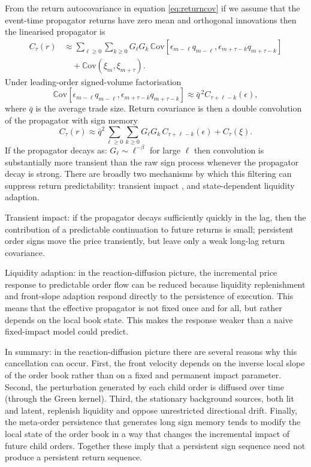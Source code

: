 \documentclass[5p,final]{elsarticle}
\newcommand{\Cov}{\mathbb{C}\mathrm{ov}}
\begin{document}
From the return autocovariance in equation \ref{eq:returncov} if we assume that the event-time propagator returns have zero mean and orthogonal innovations then the linearised propagator is
\begin{align}
C_{\tau}(r)
&\approx
\sum_{\ell\ge0}\sum_{k\ge0}G_\ell G_k\,
\Cov[\epsilon_{m-\ell}q_{m-\ell},\epsilon_{m+\tau-k}q_{m+\tau-k}] \nonumber \\
&\quad +
\Cov(\xi_m,\xi_{m+\tau}).
\end{align}
Under leading-order signed-volume factorisation 
\begin{equation}
\Cov[\epsilon_{m-\ell}q_{m-\ell},\epsilon_{m+\tau-k}q_{m+\tau-k}]
\approx \bar q^{\,2}C_{\tau+\ell-k}(\epsilon),
\end{equation}
where $\bar q$ is the average trade size. Return covariance is then a double convolution of the propagator with sign memory
\begin{equation}
    C_{\tau}(r) \approx \bar q^2 \sum_{\ell\ge0}\sum_{k\ge0}G_\ell G_k\,
C_{\tau+\ell-k}(\epsilon) + C_{\tau} (\xi).
\end{equation}
If the propagator decays as: $G_{\ell} \sim \ell^{-\beta}$ \cite{toth2011anomalous} for large $\ell$ then convolution is substantially more transient than the raw sign process whenever the propagator decay is strong. There are broadly two mechanisms by which this filtering can suppress return predictability: transient impact \cite{donier2015fully}, and state-dependent liquidity adaption. 

Transient impact: if the propagator decays sufficiently quickly in the lag, then the contribution of a predictable continuation to future returns is small; persistent order signs move the price transiently, but leave only a weak long-lag return covariance. 

Liquidity adaption: in the reaction-diffusion picture, the incremental price response to predictable order flow can be reduced because liquidity replenishment and front-slope adaption respond directly to the persistence of execution. This means that the effective propagator is not fixed once and for all, but rather depends on the local book state. This makes the response weaker than a naive fixed-impact model could predict. 

In summary: in the reaction-diffusion picture there are several reasons why this cancellation can occur. First, the front velocity depends on the inverse local slope of the order book rather than on a fixed and permanent impact parameter. Second, the perturbation generated by each child order is diffused over time (through the Green kernel). Third, the stationary background sources, both lit and latent, replenish liquidity and oppose unrestricted directional drift. Finally, the meta-order persistence that generates long sign memory tends to modify the local state of the order book in a way that changes the incremental impact of future child orders. Together these imply that a persistent sign sequence need not produce a persistent return sequence. 
\end{document}
